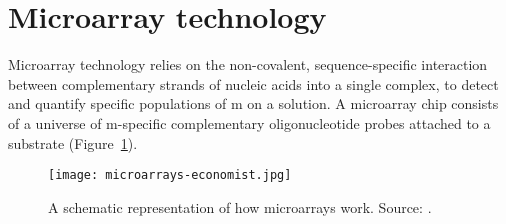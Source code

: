 \section{Microarray technology}
\label{sec:microarray-methods}

Microarray technology relies on the non-covalent, sequence-specific interaction
between complementary strands of nucleic acids into a single
complex,\cite{crick_protein_1958} to detect and quantify specific populations of
m on a solution.  A microarray chip consists of a universe of
m-specific complementary oligonucleotide probes attached to a
substrate (Figure~\ref{fig:microarray-economist}).

\begin{figure}%
  \begin{center}
    \texttt{[image: microarrays-economist.jpg]}
    \caption[Schematic representation of how microarrays work]{A schematic
      representation of how microarrays work. Source: .}
    \label{fig:microarray-economist}
  \end{center}
\end{figure}



